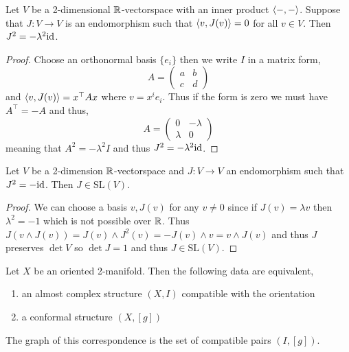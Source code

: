\documentclass[12pt]{article}
\begin{document}
\begin{lemma}
Let $V$ be a 2-dimensional $\mathbb{R}$-vectorspace with an inner product $\left< -, - \right>$. Suppose that $J : V \to V$ is an endomorphism such that $\left< v, J(v) \right> = 0$ for all $v \in V$. Then $J^2 = - \lambda^2 \mathrm{id}$.
\end{lemma}

\begin{proof}
Choose an orthonormal basis $\{ e_i \}$ then we write $I$ in a matrix form,
\[ A = 
\begin{pmatrix}
a & b 
\\
c & d 
\end{pmatrix} \]
and $\left< v, J(v) \right> = x^\top A x$ where $v = x^i e_i$. Thus if the form is zero we must have $A^\top = -A$ and thus,
\[ A = 
\begin{pmatrix}
0 & -\lambda 
\\
\lambda & 0
\end{pmatrix} \]
meaning that $A^2 = - \lambda^2 I$ and thus $J^2 = - \lambda^2 \mathrm{id}$.
\end{proof}

\begin{lemma}
Let $V$ be a 2-dimension $\mathbb{R}$-vectorspace and $J : V \to V$ an endomorphism such that $J^2 = - \mathrm{id}$. Then $J \in \mathrm{SL}(V)$.
\end{lemma}

\begin{proof}
We can choose a basis $v, J(v)$ for any $v \neq 0$ since if $J(v) = \lambda v$ then $\lambda^2 = -1$ which is not possible over $\mathbb{R}$. Thus $J(v \wedge J(v)) = J(v) \wedge J^2(v) = - J(v) \wedge v = v \wedge J(v)$ and thus $J$ preserves $\det{V}$ so $\det{J} = 1$ and thus $J \in \mathrm{SL}(V)$. 
\end{proof}

\begin{prop}
Let $X$ be an oriented 2-manifold. Then the following data are equivalent,
\begin{enumerate}
\item an almost complex structure $(X, I)$ compatible with the orientation
\item a conformal structure $(X, [g])$
\end{enumerate}
The graph of this correspondence is the set of compatible pairs $(I, [g])$.
\end{prop}
\end{document}
